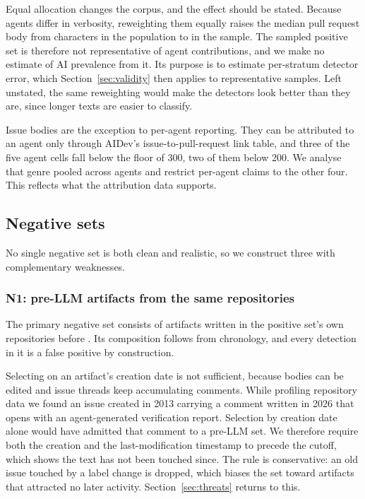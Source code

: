 Equal allocation changes the corpus, and the effect should be stated. Because agents
differ in verbosity, reweighting them equally raises the median pull request body from
\PrBodyMedianPopulation{} characters in the population to \PrBodyMedianSampled{} in the
sample. The sampled positive set is therefore not representative of agent contributions,
and we make no estimate of AI prevalence from it. Its purpose is to estimate per-stratum
detector error, which Section~\ref{sec:validity} then applies to representative samples.
Left unstated, the same reweighting would make the detectors look better than they are,
since longer texts are easier to classify.

Issue bodies are the exception to per-agent reporting. They can be attributed to an
agent only through AIDev's issue-to-pull-request link table, and three of the five agent
cells fall below the floor of 300, two of them below 200. We analyse that genre pooled
across agents and restrict per-agent claims to the other four. This reflects what the
attribution data supports.

\subsection{Negative sets}
\label{sec:groundtruth:negatives}

No single negative set is both clean and realistic, so we construct three with
complementary weaknesses.

\subsubsection{N1: pre-LLM artifacts from the same repositories}
\label{sec:groundtruth:n1}

The primary negative set consists of artifacts written in the positive set's own
repositories before \LlmCutoff{}. Its composition follows from chronology, and every
detection in it is a false positive by construction.

Selecting on an artifact's creation date is not sufficient, because bodies can be edited
and issue threads keep accumulating comments. While profiling repository data we found
an issue created in 2013 carrying a comment written in 2026 that opens with an
agent-generated verification report. Selection by creation date alone would have admitted
that comment to a pre-LLM set. We therefore require both the creation and the
last-modification timestamp to precede the cutoff, which shows the text has not been
touched since. The rule is conservative: an old issue touched by a label change is
dropped, which biases the set toward artifacts that attracted no later activity.
Section~\ref{sec:threats} returns to this.

